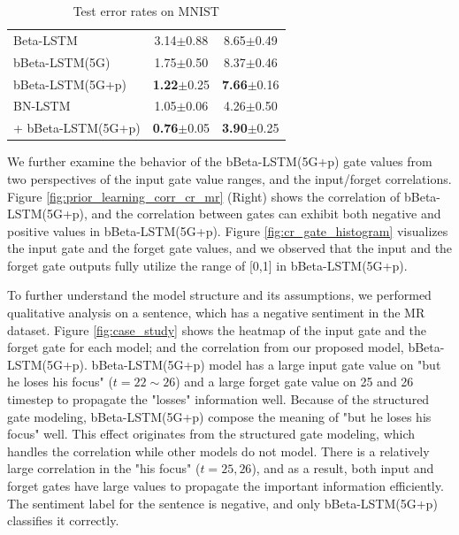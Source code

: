 \documentclass[letterpaper]{article} %
\begin{document}
\begin{table}[h!]
\begin{minipage}{.35\linewidth}
\begin{tabular}{lcc}
			\midrule
			Beta-LSTM   & 3.14$\pm$0.88 & 8.65$\pm$0.49 \\
			bBeta-LSTM(5G) & 1.75$\pm$0.50 & 8.37$\pm$0.46 \\
			bBeta-LSTM(5G+p) & \textbf{1.22}$\pm$0.25 & \textbf{7.66}$\pm$0.16 \\
			\midrule
			BN-LSTM & 1.05$\pm$0.06 & 4.26$\pm$0.50 \\
			\hspace{1pt} + bBeta-LSTM(5G+p) & \textbf{0.76}$\pm$0.05 & \textbf{3.90}$\pm$0.25 \\
			\bottomrule
		\end{tabular}
		\centering
		\caption{Test error rates on MNIST}
		\label{table:mnist}
	\end{minipage}
\end{table}
%
We further examine the behavior of the bBeta-LSTM(5G+p) gate values from two perspectives of the input gate value ranges, and the input/forget correlations. 
Figure \ref{fig:prior_learning_corr_cr_mr} (Right) shows the correlation of bBeta-LSTM(5G+p), and the correlation between gates can exhibit both negative and positive values in bBeta-LSTM(5G+p).
Figure \ref{fig:cr_gate_histogram} visualizes the input gate and the forget gate values, and we observed that the input and the forget gate outputs fully utilize the range of [0,1] in bBeta-LSTM(5G+p). 

To further understand the model structure and its assumptions, we performed qualitative analysis on a sentence, which has a negative sentiment in the MR dataset.
Figure \ref{fig:case_study} shows the heatmap of the input gate and the forget gate for each model; and the correlation from our proposed model, bBeta-LSTM(5G+p). bBeta-LSTM(5G+p) model has a large input gate value on "but he loses his focus" ($t=22\sim26$) and a large forget gate value on 25 and 26 timestep to propagate the "losses" information well. Because of the structured gate modeling, bBeta-LSTM(5G+p) compose the meaning of "but he loses his focus" well. This effect originates from the structured gate modeling, which handles the correlation while other models do not model.
There is a relatively large correlation in the "his focus" ($t=25,26$), and as a result, both input and forget gates have large values to propagate the important information efficiently. The sentiment label for the sentence is negative, and only bBeta-LSTM(5G+p) classifies it correctly.
\end{document}
